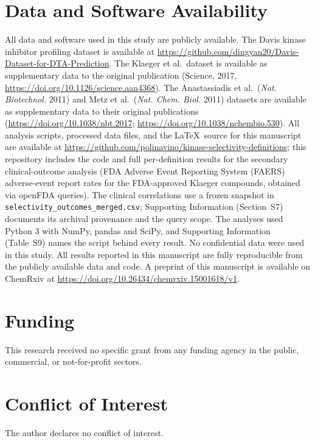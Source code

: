 \documentclass[journal=jcisd8,manuscript=article]{achemso}
\begin{document}
\section*{Data and Software Availability}
All data and software used in this study are publicly available.
The Davis kinase inhibitor profiling dataset is available at
\url{https://github.com/dingyan20/Davis-Dataset-for-DTA-Prediction}.
The Klaeger et al.\ dataset is available as supplementary data to the
original publication (Science, 2017, \url{https://doi.org/10.1126/science.aan4368}).
The Anastassiadis et al.\ (\emph{Nat. Biotechnol.} 2011) and Metz et al.\
(\emph{Nat. Chem. Biol.} 2011) datasets are available as supplementary data to
their original publications
(\url{https://doi.org/10.1038/nbt.2017}; \url{https://doi.org/10.1038/nchembio.530}).
All analysis scripts, processed data files, and the \LaTeX\ source for
this manuscript are available at
\url{https://github.com/polinavino/kinase-selectivity-definitions};
this repository includes the code and full per-definition results for the
secondary clinical-outcome analysis (FDA Adverse Event Reporting System
(FAERS) adverse-event report rates for
the FDA-approved Klaeger compounds, obtained via openFDA queries).
The clinical correlations use a frozen snapshot in
\texttt{selectivity\_outcomes\_merged.csv}; Supporting Information
(Section~S7) documents its archival provenance and the query scope.
The analyses used Python 3 with NumPy\cite{NumPy}, pandas\cite{pandas} and
SciPy\cite{SciPy}, and Supporting Information (Table~S9) names the script
behind every result.
No confidential data were used in this study.
All results reported in this manuscript are fully reproducible from the
publicly available data and code.
A preprint of this manuscript is available on ChemRxiv at
\url{https://doi.org/10.26434/chemrxiv.15001618/v1}.

\section*{Funding}
This research received no specific grant from any funding agency in the public,
commercial, or not-for-profit sectors.

\section*{Conflict of Interest}
The author declares no conflict of interest.


\end{document}
